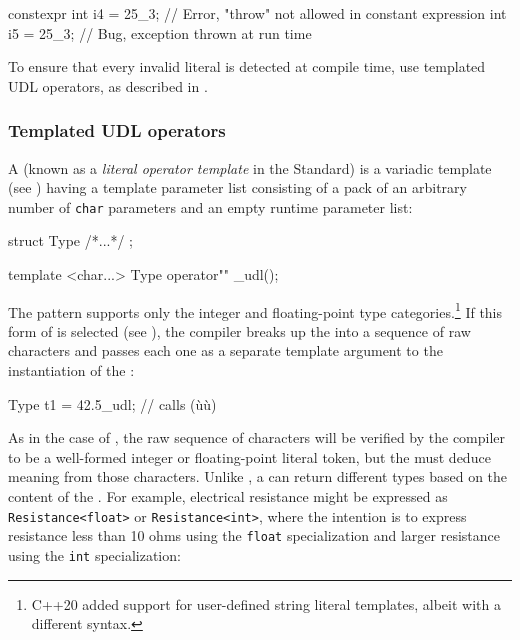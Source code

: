 \begin{emcppslisting}[emcppsbatch=e11]
constexpr int i4 = 25_3;  // Error, "throw" not allowed in constant expression
          int i5 = 25_3;  // Bug, exception thrown at run time
\end{emcppslisting}
    
\noindent To ensure that every invalid literal is detected at compile time, use
templated UDL operators, as described in .

\subsubsection[Templated UDL operators]{Templated UDL operators}\label{templated-udl-operators}

A  (known as a \emph{literal operator
template} in the Standard) is a variadic template (see ) having a template parameter list
consisting of a pack of an arbitrary number of \lstinline!char! parameters
and an empty runtime parameter list:

\begin{emcppslisting}[emcppsbatch=e12]
struct Type { /*...*/ };

template <char...> Type operator"" _udl();
\end{emcppslisting}
    
\noindent The  pattern supports only the integer
and floating-point type categories.{\cprotect\footnote{C++20 added
support for user-defined string literal templates, albeit with a
  different syntax.}} If this form of  is selected
(see ), the compiler breaks up the
 into a sequence of raw characters and passes each
one as a separate template argument to the instantiation of the
:

\begin{emcppslisting}[emcppsbatch=e12]
Type t1 = 42.5_udl;  // calls (ù{}ù)
\end{emcppslisting}
    
\noindent As in the case of , the raw sequence of
characters will be verified by the compiler to be a well-formed integer
or floating-point literal token, but the  must
deduce meaning from those characters. Unlike ,
a  can return different types based on
the content of the . For example, electrical
resistance might be expressed as \lstinline!Resistance<float>! or
\lstinline!Resistance<int>!, where the intention is to express resistance
less than 10 ohms using the \lstinline!float! specialization and larger
resistance using the \lstinline!int! specialization:

